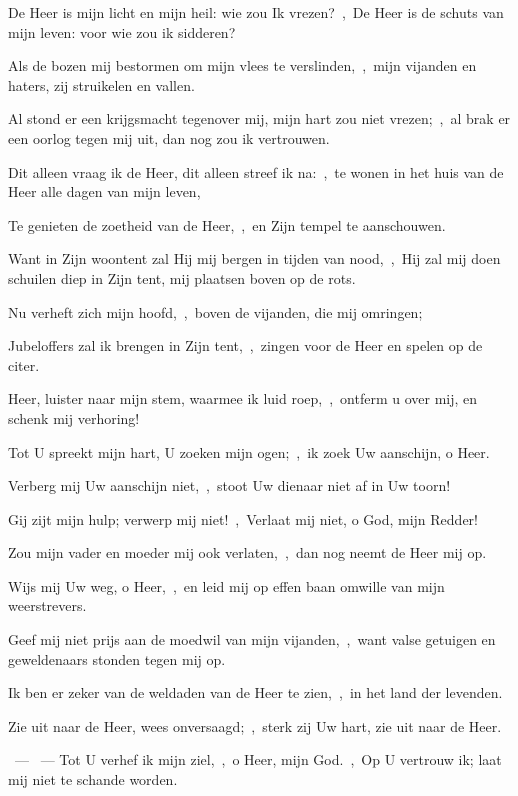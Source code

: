 \documentclass[12pt,twoside,a5paper]{article}
\begin{document}
\begin{halfparskip}
   De Heer is mijn licht en mijn heil: wie zou Ik vrezen?~\sep\ De Heer is de schuts van mijn leven: voor wie zou ik sidderen?

  Als de bozen mij bestormen om mijn vlees te verslinden,~\sep\ mijn vijanden en haters, zij struikelen en vallen.

  Al stond er een krijgsmacht tegenover mij, mijn hart zou niet vrezen;~\sep\ al brak er een oorlog tegen mij uit, dan nog zou ik vertrouwen.

  Dit alleen vraag ik de Heer, dit alleen streef ik na:~\sep\ te wonen in het huis van de Heer alle dagen van mijn leven,

  Te genieten de zoetheid van de Heer,~\sep\ en Zijn tempel te aanschouwen.

  Want in Zijn woontent zal Hij mij bergen in tijden van nood,~\sep\ Hij zal mij doen schuilen diep in Zijn tent, mij plaatsen boven op de rots.

  Nu verheft zich mijn hoofd,~\sep\ boven de vijanden, die mij omringen;

  Jubeloffers zal ik brengen in Zijn tent,~\sep\ zingen voor de Heer en spelen op de citer.

  Heer, luister naar mijn stem, waarmee ik luid roep,~\sep\ ontferm u over mij, en schenk mij verhoring!

  Tot U spreekt mijn hart, U zoeken mijn ogen;~\sep\ ik zoek Uw aanschijn, o Heer.

  Verberg mij Uw aanschijn niet,~\sep\ stoot Uw dienaar niet af in Uw toorn!

  Gij zijt mijn hulp; verwerp mij niet!~\sep\ Verlaat mij niet, o God, mijn Redder!

  Zou mijn vader en moeder mij ook verlaten,~\sep\ dan nog neemt de Heer mij op.

  Wijs mij Uw weg, o Heer,~\sep\ en leid mij op effen baan omwille van mijn weerstrevers.

  Geef mij niet prijs aan de moedwil van mijn vijanden,~\sep\ want valse getuigen en geweldenaars stonden tegen mij op.

  Ik ben er zeker van de weldaden van de Heer te zien,~\sep\ in het land der levenden.

  Zie uit naar de Heer, wees onversaagd;~\sep\ sterk zij Uw hart, zie uit naar de Heer.
\end{halfparskip}

\begin{halfparskip}
  ~--- ~---  Tot U verhef ik mijn ziel,~\sep\ o Heer, mijn God.~\sep\ Op U vertrouw ik; laat mij niet te schande worden.
\end{halfparskip}
\end{document}
